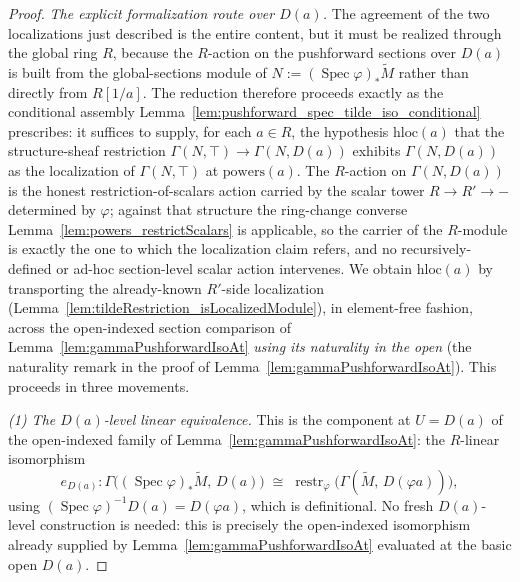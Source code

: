 \begin{proof}
  \medskip
  \emph{The explicit formalization route over \(D(a)\).} The agreement of the two
  localizations just described is the entire content, but it must be realized
  through the global ring \(R\), because the \(R\)-action on the pushforward
  sections over \(D(a)\) is built from the global-sections module of
  \(N := (\operatorname{Spec}\varphi)_*\widetilde M\) rather than directly from
  \(R[1/a]\). The reduction therefore proceeds exactly as the conditional
  assembly Lemma~\ref{lem:pushforward_spec_tilde_iso_conditional} prescribes: it
  suffices to supply, for each \(a \in R\), the hypothesis \(\mathrm{hloc}(a)\) that
  the structure-sheaf restriction \(\Gamma(N, \top) \to \Gamma(N, D(a))\) exhibits
  \(\Gamma(N, D(a))\) as the localization of \(\Gamma(N, \top)\) at
  \(\mathrm{powers}(a)\). The \(R\)-action on \(\Gamma(N, D(a))\) is the honest
  restriction-of-scalars action carried by the scalar tower \(R \to R' \to {-}\)
  determined by \(\varphi\); against that structure the ring-change converse
  Lemma~\ref{lem:powers_restrictScalars} is applicable, so the carrier of the
  \(R\)-module is exactly the one to which the localization claim refers, and no
  recursively-defined or ad-hoc section-level scalar action intervenes.
  We obtain \(\mathrm{hloc}(a)\) by transporting the already-known \(R'\)-side
  localization (Lemma~\ref{lem:tildeRestriction_isLocalizedModule}), in
  element-free fashion, across the open-indexed section comparison of
  Lemma~\ref{lem:gammaPushforwardIsoAt} \emph{using its naturality in the open}
  (the naturality remark in the proof of
  Lemma~\ref{lem:gammaPushforwardIsoAt}). This proceeds in three
  movements.

  \emph{(1) The \(D(a)\)-level linear equivalence.} This is the component at
  \(U = D(a)\) of the open-indexed family of
  Lemma~\ref{lem:gammaPushforwardIsoAt}: the \(R\)-linear isomorphism
  \[
    e_{D(a)} : \Gamma\bigl((\operatorname{Spec}\varphi)_*\widetilde M,\, D(a)\bigr)
      \;\cong\;
      \operatorname{restr}_\varphi\bigl(\Gamma(\widetilde M,\, D(\varphi a))\bigr) ,
  \]
  using \((\operatorname{Spec}\varphi)^{-1}D(a) = D(\varphi a)\), which is
  definitional. No fresh \(D(a)\)-level construction is needed: this is precisely the
  open-indexed isomorphism already supplied by
  Lemma~\ref{lem:gammaPushforwardIsoAt} evaluated at the basic open \(D(a)\).


\end{proof}
